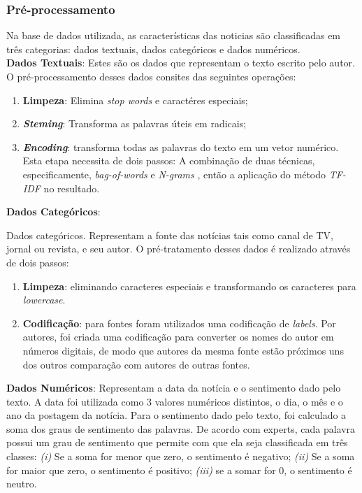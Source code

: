 \subsubsection{Pré-processamento}

Na base de dados utilizada, as características das noticias são classificadas em três categorias: dados textuais, dados categóricos e dados numéricos. \\

\textbf{Dados Textuais}: Estes são os dados que representam o texto escrito pelo autor. O pré-processamento desses dados consites das seguintes operações: \\

\begin{enumerate}
    \item \textbf{Limpeza}: Elimina \textit{stop words} e caractéres especiais;
    \item \textbf{\textit{Steming}}: Transforma as palavras úteis em radicais;
    \item \textbf{\textit{Encoding}}: transforma todas as palavras do texto em um vetor numérico. Esta etapa necessita de dois passos: A combinação de duas técnicas, especificamente, \textit{bag-of-words} \cite{gerard1983} e \textit{N-grams} \cite{chris1985}, então a aplicação do método \textit{TF-IDF} \cite{juan2003} no resultado. \\
\end{enumerate} 


\textbf{Dados Categóricos}: 


Dados categóricos. Representam a fonte das notícias tais como canal de TV, jornal ou revista, e seu autor. O pré-tratamento desses dados é realizado através de dois passos:

\begin{enumerate}
    \item \textbf{Limpeza}: eliminando caracteres especiais e transformando os caracteres para \textit{lowercase}.
    \item \textbf{Codificação}:  para fontes foram utilizados uma codificação de \textit{labels}. Por autores, foi criada uma codificação para converter os nomes do autor em números digitais, de modo que autores da mesma fonte estão próximos uns dos outros comparação com autores de outras fontes. \\

\end{enumerate}




\textbf{Dados Numéricos}: Representam a data da notícia e o sentimento dado pelo texto. A data foi utilizada como 3 valores numéricos distintos, o dia, o mês e o ano da postagem da notícia. Para o sentimento dado pelo texto, foi calculado a soma dos graus de sentimento das palavras. De acordo com experts, cada palavra possui um grau de sentimento que permite com que ela seja classificada em três classes: \textit{(i)} Se a soma for menor que zero, o sentimento é negativo; \textit{(ii)} Se a soma for maior que zero, o sentimento é positivo; \textit{(iii)} se a somar for 0, o sentimento é neutro.


